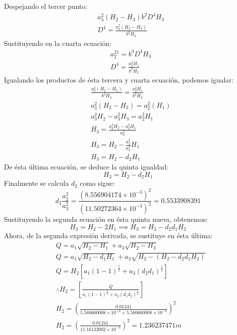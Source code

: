     Despejando el tercer punto:
    \begin{align*}
        &a_3^2\left(H_2 - H_3\right)b^2D^4H_3\\ 
        &D^4 = \frac{a_3^2\left(H_2 - H_3\right)}{b^2H_3}
    \end{align*}
    Sustituyendo en la cuarta ecuación:
    \begin{align*}
        &a_2^21 = b^3D^4H_3\\
        &D^4 = \frac{a_2^2H_1}{b^2H_3}	
    \end{align*}
    Igualando los productos de ésta tercera y cuarta ecuación, podemos igualar:
    \begin{align*}
        &\frac{a_3^2\left(H_2 - H_3\right)}{b^2H_3} = \frac{a_2^2H_1}{b^2H_3}\\
        &a_3^2\left(H_2 - H_3\right) = a_2^2\left(H_1\right)\\
        &a_3^2H_2 - a_3^2H_3 = a_2^2H_1\\
        &H_3 = \frac{a_3^2H_2 - a_2^2H_1}{a_3^2}\\
        &H_3 = H_2  - \frac{a_2^2}{a_3^2}H_1\\
        &H_3 = H_2 - d_2H_1
    \end{align*}
    De ésta última ecuación, se deduce la quinta igualdad:
    \begin{equation*}
        H_3 = H_2 - d_2H_1
    \end{equation*}
    Finalmente se calcula $d_2$ como sigue:
    \begin{equation*}
        d_2  \frac{a_2^2}{a_3^2} = \frac{\left(8.556904174 \times 10^{ - 3}\right)^2}{\left(11.50272364 \times 10^{ - 3}\right)^2} =0.5533908391
    \end{equation*}
    Sustituyendo la segunda ecuación en ésta quinta nueva, obtenemos:
    \begin{equation*}
        H_3 = H_2 - 2H_1\implies H_3 = H_2 - d_2d_1 H_2
    \end{equation*}
    Ahora, de la segunda expresión derivada, se sustituye en ésta última:
    \begin{align*}
        &Q = a_1 \sqrt{H_2 - H_1} + a_3 \sqrt{H_2 - H_3}\\
        &Q = a_1 \sqrt{H_2 - d_1H_1} + a_3 \sqrt{H_2 - \left(H_2 - d_2d_1 H_2\right)} \\
        &Q = H_2\left[a_1\left(1 - 1\right)^{\frac{1}{2}} +a_3\left(d_2d_1\right)^{\frac{1}{2}} \right]\\
        &\therefore H_2 = \left[\frac{Q}{a_1\left(1 - 1\right)^{\frac{1}{2}} + a_3\left(d_1d_2\right)^{\frac{1}{2}}} \right]\\
        &H_2 =\left(\frac{0.01241}{5.580660008 \times 10^{ - 3} + 5.580660008 \times 10^{ - 3}}\right)^2\\
        &H_2 = \left(\frac{0.01241}{11.16132002 \times 10^{ - 3}}\right)^2 = 1.236237471m
    \end{align*}
